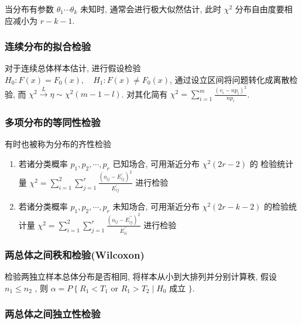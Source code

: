 \documentclass[10pt]{yerbaformat}
\begin{document}
\par 当分布有参数 $\theta_{1} \cdots \theta_{k}$ 未知时, 通常会进行极大似然估计, 此时 $\chi^2$ 分布自由度要相应减小为 $r-k-1$.

\subsubsection{连续分布的拟合检验}

\par 对于连续总体样本估计, 进行假设检验 $H_{0}: F(x)=F_{0}(x), \quad H_{1}: F(x) \neq F_{0}(x)$, 通过设立区间将问题转化成离散检验, 而 $\chi^{2} \stackrel{L}{\rightarrow} \eta \sim \chi^{2}(m-1-l)$. 对其化简有 $\chi^{2}=\sum_{i=1}^{m} \frac{\left(v_{i}-n p_{i}\right)^{2}}{n p_{i}}$.

\subsubsection{多项分布的等同性检验}

\par 有时也被称为分布的齐性检验
\begin{enumerate}
    \item 若诸分类概率 $p_{1}, p_{2}, \cdots, p_{r}$ 已知场合, 可用渐近分布 $\chi^{2}(2 r-2)$ 的 检验统计量 $\chi^{2}=\sum_{i=1}^{2} \sum_{j=1}^{r} \frac{\left(o_{i j}-E_{i j}^{\prime}\right)^{2}}{E_{i j}^{\prime}}$ 进行检验
    \item 若诸分类概率 $p_{1}, p_{2}, \cdots, p_{r}$ 未知场合, 可用渐近分布 $\chi^{2}(2 r-k-2)$ 的检验统计量 $\chi^{2}=\sum_{i=1}^{2} \sum_{j=1}^{r} \frac{\left(o_{i j}-E_{i j}^{\prime \prime}\right)^{2}}{E_{i i}^{\prime \prime}}$ 进行检验
\end{enumerate}

\subsubsection{两总体之间秩和检验(Wilcoxon)}

\par 检验两独立样本总体分布是否相同, 将样本从小到大排列并分别计算秩, 假设 $n_1 \leq n_2$ , 则 $\alpha=P\left\{R_{1}<T_{1}\right.$ or $R_{1}>T_{2} \mid H_{0}$ 成立 $\}$.

\subsubsection{两总体之间独立性检验}
\end{document}
